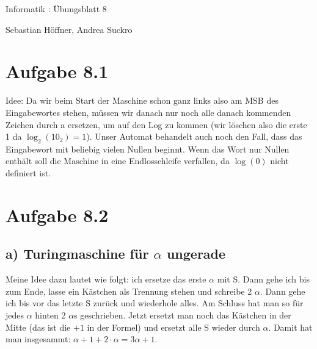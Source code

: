 \documentclass{article}
\begin{document}
\begin{center}
  \Large{Informatik \revD: Übungsblatt 8}

  \large{Sebastian Höffner, Andrea Suckro}
\end{center}



\section*{Aufgabe 8.1}
Idee: Da wir beim Start der Maschine schon ganz links also am MSB des Eingabewortes stehen, müssen wir danach nur noch alle danach kommenden Zeichen durch a ersetzen, um auf den Log zu kommen (wir löschen also die erste 1 da $\log_2(10_2) = 1$). Unser Automat behandelt auch noch den Fall, dass das Eingabewort mit beliebig vielen Nullen beginnt. Wenn das Wort nur Nullen enthält soll die Maschine in eine Endlosschleife verfallen, da $\log(0)$ nicht definiert ist.
\begin{center}
\end{center}



\section*{Aufgabe 8.2}
\subsection*{a) Turingmaschine für $\alpha$ ungerade}
Meine Idee dazu lautet wie folgt: ich ersetze das erste $\alpha$ mit S. Dann gehe ich bis zum Ende, lasse ein Kästchen als Trennung stehen und schreibe 2 $\alpha$. Dann gehe ich bis vor das letzte S zurück und wiederhole alles. Am Schluss hat man so für jedes $\alpha$ hinten 2 $\alpha$s geschrieben. Jetzt ersetzt man noch das Kästchen in der Mitte (das ist die $+1$ in der Formel) und ersetzt alle S wieder durch $\alpha$. Damit hat man insgesammt: $\alpha+1+2\cdot \alpha = 3\alpha +1$.
\end{document}
